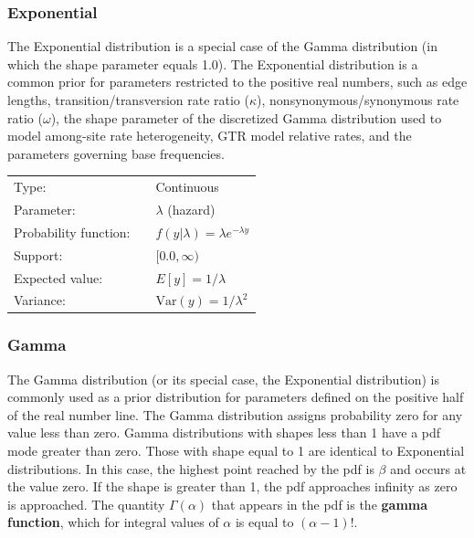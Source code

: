 \documentclass[10pt]{article}
\newcommand{\term}[1]{{\bfseries #1}\index{#1}}		%
\newcommand{\Var}{\mbox{Var}}
\begin{document}
\subsubsection{Exponential}\label{exponentialdist}

The Exponential distribution is a special case of the Gamma distribution (in which the shape parameter equals 1.0). The Exponential distribution is a common prior for parameters restricted to the positive real numbers, such as edge lengths, transition/transversion rate ratio ($\kappa$), nonsynonymous/synonymous rate ratio ($\omega$), the shape parameter of the discretized Gamma distribution used to model among-site rate heterogeneity, GTR model relative rates, and the parameters governing base frequencies.

\begin{tabular}{lcl}
Type:                 & & Continuous \\
Parameter:            & & $\lambda$ (hazard)    \\
Probability function: & & $f(y|\lambda) = \lambda e^{-\lambda y}$ \\
Support:              & & $[0.0,\infty)$     \\
Expected value:       & & $E[y] = 1/\lambda$ \\
Variance:             & & $\Var(y) = 1/\lambda^2$ 
\end{tabular}

\subsubsection{Gamma}\label{gammadist}

The Gamma distribution (or its special case, the Exponential distribution) is commonly used as a prior distribution for parameters defined on the positive half of the real number line. The Gamma distribution assigns probability zero for any value less than zero. Gamma distributions with shapes less than 1 have a pdf mode greater than zero. Those with shape equal to 1 are identical to Exponential distributions. In this case, the highest point reached by the pdf is $\beta$ and occurs at the value zero. If the shape is greater than 1, the pdf approaches infinity as zero is approached. The quantity $\Gamma(\alpha)$ that appears in the pdf is the \term{gamma function}, which for integral values of $\alpha$ is equal to $(\alpha-1)!$.
\end{document}
